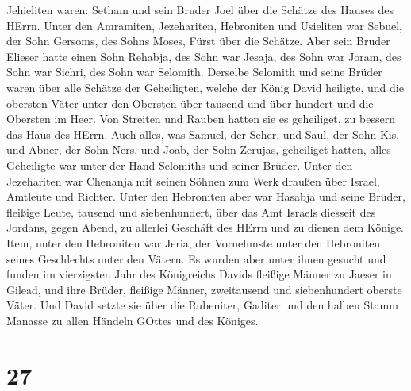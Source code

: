 Jehieliten waren: Setham und sein Bruder Joel über die Schätze des
Hauses des HErrn.  Unter den Amramiten, Jezehariten,
Hebroniten und Usieliten  war Sebuel, der Sohn Gersoms, des
Sohns Moses, Fürst über die Schätze.  Aber sein Bruder
Elieser hatte einen Sohn Rehabja, des Sohn war Jesaja, des Sohn war
Joram, des Sohn war Sichri, des Sohn war Selomith. 
Derselbe Selomith und seine Brüder waren über alle Schätze der
Geheiligten, welche der König David heiligte, und die obersten Väter
unter den Obersten über tausend und über hundert und die Obersten im
Heer.  Von Streiten und Rauben hatten sie es geheiliget, zu
bessern das Haus des HErrn.  Auch alles, was Samuel, der
Seher, und Saul, der Sohn Kis, und Abner, der Sohn Ners, und Joab, der
Sohn Zerujas, geheiliget hatten, alles Geheiligte war unter der Hand
Selomiths und seiner Brüder.  Unter den Jezehariten war
Chenanja mit seinen Söhnen zum Werk draußen über Israel, Amtleute und
Richter.  Unter den Hebroniten aber war Hasabja und seine
Brüder, fleißige Leute, tausend und siebenhundert, über das Amt Israels
diesseit des Jordans, gegen Abend, zu allerlei Geschäft des HErrn und zu
dienen dem Könige.  Item, unter den Hebroniten war Jeria,
der Vornehmste unter den Hebroniten seines Geschlechts unter den Vätern.
Es wurden aber unter ihnen gesucht und funden im vierzigsten Jahr des
Königreichs Davids fleißige Männer zu Jaeser in Gilead, 
und ihre Brüder, fleißige Männer, zweitausend und siebenhundert oberste
Väter. Und David setzte sie über die Rubeniter, Gaditer und den halben
Stamm Manasse zu allen Händeln GOttes und des Königes.

\hypertarget{section-26}{%
\section{27}\label{section-26}}

